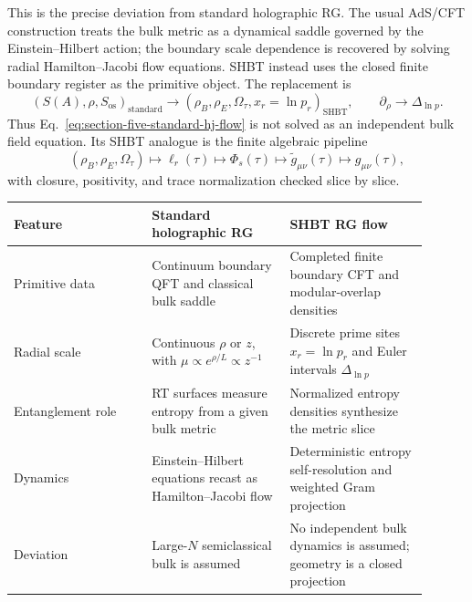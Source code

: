 \documentclass[11pt,letterpaper]{article}
\theoremstyle{plain}
\begin{document}
This is the precise deviation from standard holographic RG.  The usual
AdS/CFT construction treats the bulk metric as a dynamical saddle governed by
the Einstein--Hilbert action; the boundary scale dependence is recovered by
solving radial Hamilton--Jacobi flow equations.  SHBT instead uses the closed
finite boundary register as the primitive object.  The replacement is
\begin{equation}
\label{eq:section-five-standard-to-shbt-rg-replacement}
 \left(
 S(A),\rho,S_{\text{os}}
 \right)_{\text{standard}}
 \longrightarrow
 \left(
 \rho_B,\rho_E,\Omega_{\tau},x_r=\ln p_r
 \right)_{\text{SHBT}},
 \qquad
 \partial_{\rho}
 \longrightarrow
 \Delta_{\ln p}.
\end{equation}
Thus Eq.~\eqref{eq:section-five-standard-hj-flow} is not solved as an
independent bulk field equation.  Its SHBT analogue is the finite algebraic
pipeline
\begin{equation}
\label{eq:section-five-shbt-rg-comparison-map}
 (\rho_B,\rho_E,\Omega_{\tau})
 \longmapsto
 \ell_r(\tau)
 \longmapsto
 \Phi_s(\tau)
 \longmapsto
 \widetilde g_{\mu\nu}(\tau)
 \longmapsto
 g_{\mu\nu}(\tau),
\end{equation}
with closure, positivity, and trace normalization checked slice by slice.

\begin{center}
\small
\begin{tabular}{@{}L{0.30\linewidth}L{0.30\linewidth}L{0.30\linewidth}@{}}
\toprule
Feature & Standard holographic RG & SHBT RG flow \\
\midrule
Primitive data & Continuum boundary QFT and classical bulk saddle &
Completed finite boundary CFT and modular-overlap densities \\
Radial scale & Continuous $\rho$ or $z$, with $\mu\propto e^{\rho/L}\propto z^{-1}$ &
Discrete prime sites $x_r=\ln p_r$ and Euler intervals $\Delta_{\ln p}$ \\
Entanglement role & RT surfaces measure entropy from a given bulk metric &
Normalized entropy densities synthesize the metric slice \\
Dynamics & Einstein--Hilbert equations recast as Hamilton--Jacobi flow &
Deterministic entropy self-resolution and weighted Gram projection \\
Deviation & Large-$N$ semiclassical bulk is assumed &
No independent bulk dynamics is assumed; geometry is a closed projection \\
\bottomrule
\end{tabular}
\end{center}
\end{document}
